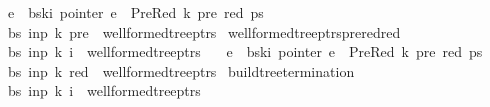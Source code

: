 \begin{isabellebody}
\ \ \ {\isachardoublequoteopen}e\ {\isacharequal}{\kern0pt}\ bs{\isacharbang}{\kern0pt}k{\isacharbang}{\kern0pt}i{\isachardoublequoteclose}\ {\isachardoublequoteopen}pointer\ e\ {\isacharequal}{\kern0pt}\ PreRed\ {\isacharparenleft}{\kern0pt}k{\isacharprime}{\kern0pt}{\isacharcomma}{\kern0pt}\ pre{\isacharcomma}{\kern0pt}\ red{\isacharparenright}{\kern0pt}\ ps{\isachardoublequoteclose}\isanewline
\ \ \ {\isachardoublequoteopen}{\isacharparenleft}{\kern0pt}bs{\isacharcomma}{\kern0pt}\ inp{\isacharcomma}{\kern0pt}\ k{\isacharprime}{\kern0pt}{\isacharcomma}{\kern0pt}\ pre{\isacharparenright}{\kern0pt}\ {\isasymin}\ wellformed{\isacharunderscore}{\kern0pt}tree{\isacharunderscore}{\kern0pt}ptrs{\isachardoublequoteclose}%
\isadelimproof
%
\endisadelimproof
%
\isatagproof
%
\endisatagproof
{\isafoldproof}%
%
\isadelimproof
\isanewline
%
\endisadelimproof
{}\isamarkupfalse%
\ wellformed{\isacharunderscore}{\kern0pt}tree{\isacharunderscore}{\kern0pt}ptrs{\isacharunderscore}{\kern0pt}prered{\isacharunderscore}{\kern0pt}red{\isacharcolon}{\kern0pt}\isanewline
\ \ \ {\isachardoublequoteopen}{\isacharparenleft}{\kern0pt}bs{\isacharcomma}{\kern0pt}\ inp{\isacharcomma}{\kern0pt}\ k{\isacharcomma}{\kern0pt}\ i{\isacharparenright}{\kern0pt}\ {\isasymin}\ wellformed{\isacharunderscore}{\kern0pt}tree{\isacharunderscore}{\kern0pt}ptrs{\isachardoublequoteclose}\isanewline
\ \ \ {\isachardoublequoteopen}e\ {\isacharequal}{\kern0pt}\ bs{\isacharbang}{\kern0pt}k{\isacharbang}{\kern0pt}i{\isachardoublequoteclose}\ {\isachardoublequoteopen}pointer\ e\ {\isacharequal}{\kern0pt}\ PreRed\ {\isacharparenleft}{\kern0pt}k{\isacharprime}{\kern0pt}{\isacharcomma}{\kern0pt}\ pre{\isacharcomma}{\kern0pt}\ red{\isacharparenright}{\kern0pt}\ ps{\isachardoublequoteclose}\isanewline
\ \ \ {\isachardoublequoteopen}{\isacharparenleft}{\kern0pt}bs{\isacharcomma}{\kern0pt}\ inp{\isacharcomma}{\kern0pt}\ k{\isacharcomma}{\kern0pt}\ red{\isacharparenright}{\kern0pt}\ {\isasymin}\ wellformed{\isacharunderscore}{\kern0pt}tree{\isacharunderscore}{\kern0pt}ptrs{\isachardoublequoteclose}%
\isadelimproof
%
\endisadelimproof
%
\isatagproof
%
\endisatagproof
{\isafoldproof}%
%
\isadelimproof
\isanewline
%
\endisadelimproof
{}\isamarkupfalse%
\ build{\isacharunderscore}{\kern0pt}tree{\isacharprime}{\kern0pt}{\isacharunderscore}{\kern0pt}termination{\isacharcolon}{\kern0pt}\isanewline
\ \ \ {\isachardoublequoteopen}{\isacharparenleft}{\kern0pt}bs{\isacharcomma}{\kern0pt}\ inp{\isacharcomma}{\kern0pt}\ k{\isacharcomma}{\kern0pt}\ i{\isacharparenright}{\kern0pt}\ {\isasymin}\ wellformed{\isacharunderscore}{\kern0pt}tree{\isacharunderscore}{\kern0pt}ptrs{\isachardoublequoteclose}\isanewline

\end{isabellebody}
